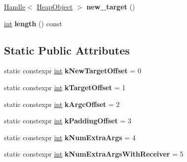 \begin{DoxyCompactItemize}
\item 
\mbox{\label{classv8_1_1internal_1_1BuiltinArguments_ac5ee243a0c6ed4b87a4e282767570fa9}} 
\mbox{\hyperlink{classv8_1_1internal_1_1Handle}{Handle}}$<$ \mbox{\hyperlink{classv8_1_1internal_1_1HeapObject}{Heap\+Object}} $>$ {\bfseries new\+\_\+target} ()
\item 
\mbox{\label{classv8_1_1internal_1_1BuiltinArguments_a6c6581ca4f1e2f38db9f5e6438f5e87c}} 
\mbox{\hyperlink{classint}{int}} {\bfseries length} () const
\end{DoxyCompactItemize}
\subsection*{Static Public Attributes}
\begin{DoxyCompactItemize}
\item 
\mbox{\label{classv8_1_1internal_1_1BuiltinArguments_aa16ea36f7b7dab372a6048be05ccad9f}} 
static constexpr \mbox{\hyperlink{classint}{int}} {\bfseries k\+New\+Target\+Offset} = 0
\item 
\mbox{\label{classv8_1_1internal_1_1BuiltinArguments_a7771017ef29ac806035d6b70dbec9a0e}} 
static constexpr \mbox{\hyperlink{classint}{int}} {\bfseries k\+Target\+Offset} = 1
\item 
\mbox{\label{classv8_1_1internal_1_1BuiltinArguments_a37c52ace87edfcaa66dfa71fad893640}} 
static constexpr \mbox{\hyperlink{classint}{int}} {\bfseries k\+Argc\+Offset} = 2
\item 
\mbox{\label{classv8_1_1internal_1_1BuiltinArguments_aeced067762822a5532d789d958d8c865}} 
static constexpr \mbox{\hyperlink{classint}{int}} {\bfseries k\+Padding\+Offset} = 3
\item 
\mbox{\label{classv8_1_1internal_1_1BuiltinArguments_ad94e52f74933a493b63e189d8fffe138}} 
static constexpr \mbox{\hyperlink{classint}{int}} {\bfseries k\+Num\+Extra\+Args} = 4
\item 
\mbox{\label{classv8_1_1internal_1_1BuiltinArguments_a039ed2c699ec21e14d5455a48773250e}} 
static constexpr \mbox{\hyperlink{classint}{int}} {\bfseries k\+Num\+Extra\+Args\+With\+Receiver} = 5
\end{DoxyCompactItemize}


